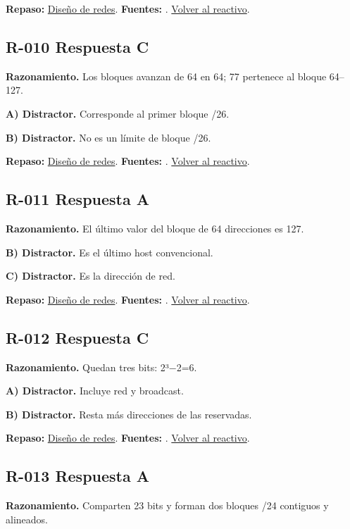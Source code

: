 \textbf{Repaso:} \hyperref[sec:r1]{Diseño de redes}. \textbf{Fuentes:} \cite{rfc8200,rfc4632,networks,vlan}. \hyperref[q:R-009]{Volver al reactivo}.\par\medskip

\subsection*{R-010 \quad Respuesta C}\label{s:R-010}
\textbf{Razonamiento.} Los bloques avanzan de 64 en 64; 77 pertenece al bloque 64–127.

\textbf{A) Distractor. }Corresponde al primer bloque /26.

\textbf{B) Distractor. }No es un límite de bloque /26.

\textbf{Repaso:} \hyperref[sec:r1]{Diseño de redes}. \textbf{Fuentes:} \cite{rfc8200,rfc4632,networks,vlan}. \hyperref[q:R-010]{Volver al reactivo}.\par\medskip

\subsection*{R-011 \quad Respuesta A}\label{s:R-011}
\textbf{Razonamiento.} El último valor del bloque de 64 direcciones es 127.

\textbf{B) Distractor. }Es el último host convencional.

\textbf{C) Distractor. }Es la dirección de red.

\textbf{Repaso:} \hyperref[sec:r1]{Diseño de redes}. \textbf{Fuentes:} \cite{rfc8200,rfc4632,networks,vlan}. \hyperref[q:R-011]{Volver al reactivo}.\par\medskip

\subsection*{R-012 \quad Respuesta C}\label{s:R-012}
\textbf{Razonamiento.} Quedan tres bits: 2³−2=6.

\textbf{A) Distractor. }Incluye red y broadcast.

\textbf{B) Distractor. }Resta más direcciones de las reservadas.

\textbf{Repaso:} \hyperref[sec:r1]{Diseño de redes}. \textbf{Fuentes:} \cite{rfc8200,rfc4632,networks,vlan}. \hyperref[q:R-012]{Volver al reactivo}.\par\medskip

\subsection*{R-013 \quad Respuesta A}\label{s:R-013}
\textbf{Razonamiento.} Comparten 23 bits y forman dos bloques /24 contiguos y alineados.

